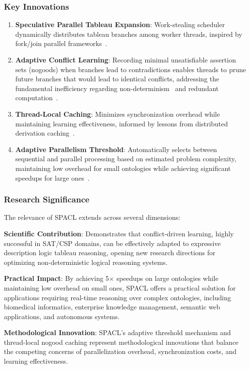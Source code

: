 \subsubsection{Key Innovations}

\begin{enumerate}
    \item \textbf{Speculative Parallel Tableau Expansion}: Work-stealing scheduler dynamically distributes tableau branches among worker threads, inspired by fork/join parallel frameworks~\cite{faddoul2015fork,quan2017parallel}.
    
    \item \textbf{Adaptive Conflict Learning}: Recording minimal unsatisfiable assertion sets (nogoods) when branches lead to contradictions enables threads to prune future branches that would lead to identical conflicts, addressing the fundamental inefficiency regarding non-determinism~\cite{faddoul2015fork} and redundant computation~\cite{steigmiller2020parallelised}.
    
    \item \textbf{Thread-Local Caching}: Minimizes synchronization overhead while maintaining learning effectiveness, informed by lessons from distributed derivation caching~\cite{steigmiller2020parallelised}.
    
    \item \textbf{Adaptive Parallelism Threshold}: Automatically selects between sequential and parallel processing based on estimated problem complexity, maintaining low overhead for small ontologies while achieving significant speedups for large ones~\cite{quan2017parallel}.
\end{enumerate}

\subsubsection{Research Significance}

The relevance of SPACL extends across several dimensions:

\textbf{Scientific Contribution}: Demonstrates that conflict-driven learning, highly successful in SAT/CSP domains, can be effectively adapted to expressive description logic tableau reasoning, opening new research directions for optimizing non-deterministic logical reasoning systems.

\textbf{Practical Impact}: By achieving 5$\times$ speedups on large ontologies while maintaining low overhead on small ones, SPACL offers a practical solution for applications requiring real-time reasoning over complex ontologies, including biomedical informatics, enterprise knowledge management, semantic web applications, and autonomous systems.

\textbf{Methodological Innovation}: SPACL's adaptive threshold mechanism and thread-local nogood caching represent methodological innovations that balance the competing concerns of parallelization overhead, synchronization costs, and learning effectiveness.


